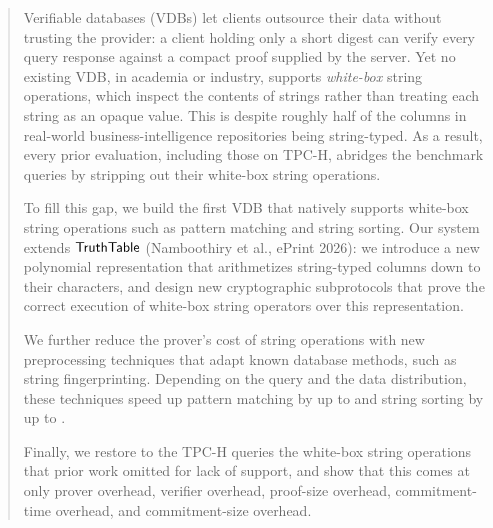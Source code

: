 \begin{abstract}
  Verifiable databases (VDBs) let clients outsource their data without trusting the provider: a client holding only a short digest can verify every query response against a compact proof supplied by the server. Yet no existing VDB, in academia or industry, supports \emph{white-box} string operations, which inspect the contents of strings rather than treating each string as an opaque value. This is despite roughly half of the columns in real-world business-intelligence repositories being string-typed. As a result, every prior evaluation, including those on TPC-H, abridges the benchmark queries by stripping out their white-box string operations.

  To fill this gap, we build the first VDB that natively supports white-box string operations such as pattern matching and string sorting. Our system extends $\truthtable$ (Namboothiry et al., ePrint 2026): we introduce a new polynomial representation that arithmetizes string-typed columns down to their characters, and design new cryptographic subprotocols that prove the correct execution of white-box string operators over this representation.

  We further reduce the prover's cost of string operations with new preprocessing techniques that adapt known database methods, such as string fingerprinting. Depending on the query and the data distribution, these techniques speed up pattern matching by up to \XXX and string sorting by up to \XXX.

  Finally, we restore to the TPC-H queries the white-box string operations that prior work omitted for lack of support, and show that this comes at only \XXX prover overhead, \XXX verifier overhead, \XXX proof-size overhead, \XXX commitment-time overhead, and \XXX commitment-size overhead.
\end{abstract}
